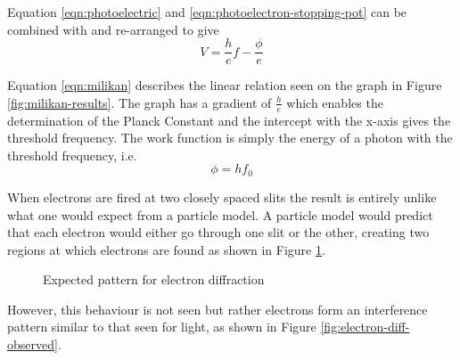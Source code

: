 \documentclass[revision-guide.tex]{subfiles}
\begin{document}
Equation \ref{eqn:photoelectric} and \ref{eqn:photoelectron-stopping-pot} can be combined with  and re-arranged to give
\begin{equation}\label{eqn:milikan}
V = \frac{h}{e}f - \frac{\phi}{e}
\end{equation}

Equation \ref{eqn:milikan} describes the linear relation seen on the graph in Figure \ref{fig:milikan-results}. The graph has a gradient of $\frac{h}{e}$ which enables the determination of the Planck Constant and the intercept with the x-axis gives the threshold frequency. The work function is simply the energy of a photon with the threshold frequency, i.e.
\begin{equation}
  \phi = hf_0
\end{equation}


When electrons are fired at two closely spaced slits the result is entirely unlike what one would expect from a particle model. A particle model would predict that each electron would either go through one slit or the other, creating two regions at which electrons are found as shown in Figure \ref{fig:electron-diff-expected}.

\begin{figure}[h]
  \begin{center}
  \end{center}
  \caption{Expected pattern for electron diffraction}
  \label{fig:electron-diff-expected}
\end{figure}


However, this behaviour is not seen but rather electrons form an interference pattern similar to that seen for light, as shown in Figure \ref{fig:electron-diff-observed}.
\end{document}
